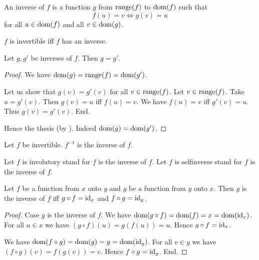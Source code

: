 \documentclass[../../set-theory.tex]{subfiles}
\begin{document}
  \begin{forthel}
    \begin{definition}
      An inverse of $f$ is a function $g$ from $\operatorname{range}(f)$ to $\operatorname{dom}(f)$ such that \[ f(u) = v \iff g(v) = u \] for all $u \in \operatorname{dom}(f)$ and all $v \in \operatorname{dom}(g)$.
    \end{definition}

    \begin{definition}
      $f$ is invertible iff $f$ has an inverse.
    \end{definition}

    \begin{lemma}
      Let $g,g'$ be inverses of $f$.
      Then $g = g'$.
    \end{lemma}
    \begin{proof}
      We have $\operatorname{dom}(g) = \operatorname{range}(f) = \operatorname{dom}(g')$.

      Let us show that $g(v) = g'(v)$ for all $v \in \operatorname{range}(f)$.
        Let $v \in \operatorname{range}(f)$.
        Take $u = g'(v)$.
        Then $g(v) = u$ iff $f(u) = v$.
        We have $f(u) = v$ iff $g'(v) = u$.
        Thus $g(v) = g'(v)$.
      End.

      Hence the thesis (by ).
      Indeed $\operatorname{dom}(g) = \operatorname{dom}(g')$.
    \end{proof}

    \begin{definition}
      Let $f$ be invertible.
      $f^{-1}$ is the inverse of $f$.
    \end{definition}

    Let $f$ is involutory stand for $f$ is the inverse of $f$.
    Let $f$ is selfinverse stand for $f$ is the inverse of $f$.

    \begin{proposition}\label{SetTheory_02_03_587168}
      Let $f$ be a function from $x$ onto $y$ and $g$ be a function from $y$ onto $x$.
      Then $g$ is the inverse of $f$ iff $g \circ f = \operatorname{id}_{x}$ and $f \circ g = \operatorname{id}_{y}$.
    \end{proposition}
    \begin{proof}
      Case $g$ is the inverse of $f$.
        We have $\operatorname{dom}(g \circ f) = \operatorname{dom}(f) = x = \operatorname{dom}(\operatorname{id}_{x})$.
        For all $u \in x$ we have $(g \circ f)(u) = g(f(u)) = u$.
        Hence $g \circ f = \operatorname{id}_{x}$.

        We have $\operatorname{dom}(f \circ g) = \operatorname{dom}(g) = y = \operatorname{dom}(\operatorname{id}_{y})$.
        For all $v \in y$ we have $(f \circ g)(v) = f(g(v)) = v$.
        Hence $f \circ g = \operatorname{id}_{y}$.
      End.


\end{proof}
\end{forthel}
\end{document}
